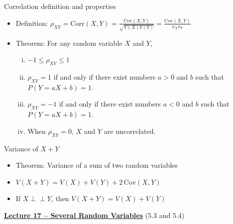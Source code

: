 \documentclass{article}
\newcommand{\bu}[1]{\textbf{\ul{#1}}}				%
\newcommand{\ind}{\perp \!\!\! \perp}			%
\newcommand{\cov}[1]{\mathrm{Cov}(#1)}		%
\newcommand{\corr}[1]{\mathrm{Corr}(#1)}		%
\begin{document}
Correlation definition and properties
\begin{itemize}
    \item Definition: $\displaystyle \rho_{XY} = \corr{X,Y} = \frac{\cov{X,Y}}{\sqrt{V(X) V(Y)}} = \frac{\cov{X,Y}}{\sigma_X \sigma_Y}$
    \item Theorem: For any random variable $X$ and $Y$,
    \begin{enumerate}[i)]
        \item $-1 \le \rho_{XY} \le 1$ 
        \item $\rho_{XY} = 1$ if and only if there exist numbers $a > 0$ and $b$ such that $P(Y = aX + b) = 1$.
        \item $\rho_{XY} = -1$ if and only if there exist numbers $a < 0$ and $b$ such that $P(Y = aX + b) = 1$. 
        \item When $\rho_{XY} = 0$, $X$ and $Y$ are uncorrelated.
    \end{enumerate}
\end{itemize}\bigskip

Variance of $X + Y$
\begin{itemize}
    \item Theorem: Variance of a sum of two random variables
    \item[] $V(X + Y) = V(X) + V(Y) + 2 \,\cov{X,Y}$
    \item[] If $X \ind Y$, then $V(X + Y) = V(X) + V(Y)$
\end{itemize}\bigskip

\newpage

{\large \bu{Lecture 17 -- Several Random Variables}} (5.3 and 5.4)\bigskip
\end{document}
